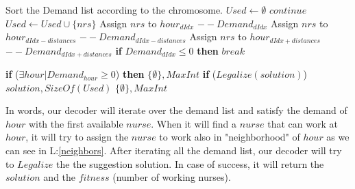 \documentclass{article}
\newcommand\tab[1][1cm]{\hspace*{#1}}
\begin{document}
		\begin{algorithmic}[1]
			\State Sort the Demand list according to the chromosome. \label{sort}
			\State $Used \leftarrow \emptyset$
				    \State $continue$
			    \EndIf
				        \State $Used \leftarrow Used \cup \{nrs\}$
		    		    \State Assign $nrs$ to $hour_{dIdx}$
		    		    \State $--Demand_{dIdx}$
		    		     \label{neighbors}
		    		    \State {}
		    		            \State Assign $nrs$ to $hour_{dIdx-distances}$
		    		            \State $--Demand_{dIdx-distances}$
		    		        \EndIf
		    		            \State Assign $nrs$ to $hour_{dIdx+distances}$
		    		            \State $--Demand_{dIdx+distances}$
		    		        \EndIf
		    		    \EndFor {}
			        \EndIf
			        \State \textbf{if} {$Demand_{dIdx} \leq 0 $} \textbf{then} \textbf{$break$}
			    \EndFor 
			    \State {}
		    \EndFor {}

		\State \textbf{if} ($\exists hour | Demand_{hour} \ge 0  $) \textbf{then}
		    \State \tab \Return $\{\emptyset\}, MaxInt$
		\State \textbf{if} ($Legalize(solution)$) 
		    \State \tab \Return $solution, SizeOf(Used)$
		\State \Return $\{\emptyset\}, MaxInt$
		\EndFunction
		\end{algorithmic}
\tab In words, our decoder will iterate over the demand list and satisfy the demand of $hour$ with the first available $nurse$. When it will find a $nurse$ that can work at $hour$, it will try to assign the $nurse$ to work also in "neighborhood" of $hour$ as we can see in L:\ref{neighbors}. After iterating all the demand list, our decoder will try to $Legalize$ the the suggestion solution. In case of success, it will return the $solution$ and the $fitness$ (number of working nurses).
\end{document}
